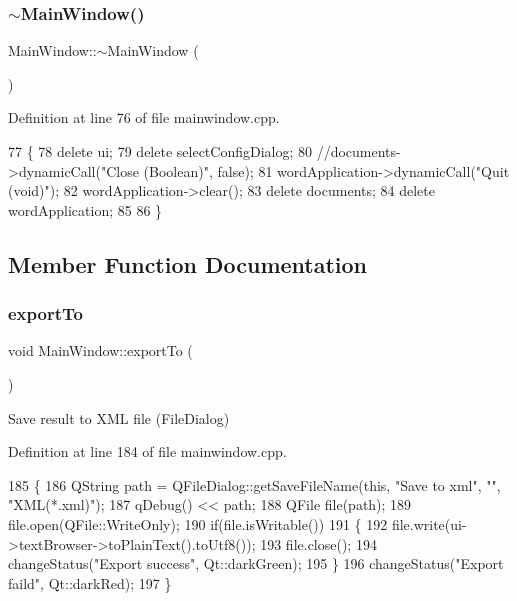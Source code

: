 \subsubsection{\texorpdfstring{$\sim$\+Main\+Window()}{~MainWindow()}}
{\footnotesize\ttfamily Main\+Window\+::$\sim$\+Main\+Window (\begin{DoxyParamCaption}{ }\end{DoxyParamCaption})}



Definition at line 76 of file mainwindow.\+cpp.


\begin{DoxyCode}
77 \{
78     \textcolor{keyword}{delete} ui;
79     \textcolor{keyword}{delete} selectConfigDialog;
80     \textcolor{comment}{//documents->dynamicCall("Close (Boolean)", false);}
81     wordApplication->dynamicCall(\textcolor{stringliteral}{"Quit (void)"});
82     wordApplication->clear();
83     \textcolor{keyword}{delete} documents;
84     \textcolor{keyword}{delete} wordApplication;
85 
86 \}
\end{DoxyCode}


\subsection{Member Function Documentation}
\mbox{\label{class_main_window_abcf1ecfd08a6967a28853153281ce4d8}} 
\subsubsection{\texorpdfstring{export\+To}{exportTo}}
{\footnotesize\ttfamily void Main\+Window\+::export\+To (\begin{DoxyParamCaption}{ }\end{DoxyParamCaption})\hspace{0.3cm}{\ttfamily [slot]}}

Save result to X\+ML file (File\+Dialog) 

Definition at line 184 of file mainwindow.\+cpp.


\begin{DoxyCode}
185 \{
186     QString path = QFileDialog::getSaveFileName(\textcolor{keyword}{this}, \textcolor{stringliteral}{"Save to xml"}, \textcolor{stringliteral}{""}, \textcolor{stringliteral}{"XML(*.xml)"});
187     qDebug() << path;
188     QFile file(path);
189     file.open(QFile::WriteOnly);
190     \textcolor{keywordflow}{if}(file.isWritable())
191     \{
192         file.write(ui->textBrowser->toPlainText().toUtf8());
193         file.close();
194         changeStatus(\textcolor{stringliteral}{"Export success"}, Qt::darkGreen);
195     \}
196     changeStatus(\textcolor{stringliteral}{"Export faild"}, Qt::darkRed);
197 \}
\end{DoxyCode}
\mbox{\label{class_main_window_addb903e5eac4179672e9825847af9be0}} 
